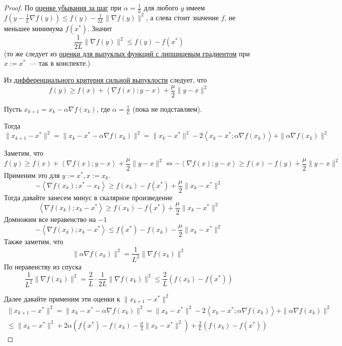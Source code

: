 \begin{proof}
  По \hyperref[note:FFEA1F1D-B70C-4B4A-9386-8344A2A3BBC4]{оценке убывания за шаг} при $\alpha = \frac{1}{L}$ для любого $y$ имеем $f\left(y - \frac{1}{L}\nabla f(y)\right) \le f(y) - \frac{1}{2L}\|\nabla f(y)\|^2$, а слева стоит значение $f$, не меньшее минимума $f(x^{*})$. Значит
  \[
  \frac{1}{2L}\| \nabla f(y)\|^2 \le f(y) - f(x^{*})
  \]
  (то же следует из \hyperref[note:655064DF-D686-4726-83DC-6F3D67CC5B9C]{оценки для выпуклых функций с липшицевым градиентом} при $x := x^{*}$~--- так в конспекте.)

  Из \hyperref[note:1B5A3E25-56E8-4D5E-9CF6-E2731DA77604]{дифференциального критерия сильной выпуклости} следует, что
  \[
  f(y) \ge f(x) + \left\langle \nabla f(x); y-x \right\rangle + \frac{\mu}{2} \|y-x\|^2
  \]

  Пусть $x_{k+1} = x_k -\alpha \nabla f(x_k)$, где $\alpha = \frac{1}{L}$ (пока не подставляем).

  Тогда
  \[
  \| x_{k+1} - x^{*}\|^2 = \|x_k - x^{*} - \alpha \nabla f(x_k)\|^2
  = \|x_k - x^{*}\|^2 - 2 \left\langle x_k - x^{*}; \alpha \nabla f(x_k) \right\rangle + \| \alpha \nabla f(x_k)\|^2
  \]

  Заметим, что
  \[
  f(y) \ge f(x) + \left\langle \nabla f(x); y-x \right\rangle + \frac{\mu}{2} \|y-x\|^2 \Leftrightarrow -
  \left\langle \nabla f(x); y-x \right\rangle \ge f(x) - f(y) + \frac{\mu}{2} \|y-x\|^2
  \]
  Применим это для $y:=x^{*}, x:=x_{k}$.
  \[
  -\left\langle \nabla f(x_k); x^{*}-x_k \right\rangle \ge f(x_k) - f(x^*) + \frac{\mu}{2} \|x_k-x^*\|^2
  \]
  Тогда давайте занесем минус в скалярное произведение
  \[
  \left\langle \nabla f(x_k); x_k - x^{*} \right\rangle \ge f(x_k) - f(x^*) + \frac{\mu}{2} \|x_k-x^*\|^2
  \]
  Домножим все неравенство на $-1$
  \[- \left\langle \nabla f(x_k); x_k - x^{*} \right\rangle \le  f(x^*) - f(x_k) - \frac{\mu}{2} \|x_k-x^*\|^2
  \]
  Также заметим, что
  \[
  \| \alpha \nabla f(x_k)\|^2 = \frac{1}{L^2} \| \nabla f(x_k)\|^2
  \]
  По неравенству из спуска
  \[
  \frac{1}{L^2} \| \nabla f(x_k)\|^2   = \frac{2}{L} \cdot \frac{1}{2L} \| \nabla f(x_k)\|^2
  \le \frac{2}{L} (f(x_k) - f(x^{*}))
  \]

  Далее давайте применим эти оценки к $\|x_{k+1} - x^{*}\|^2$
  \begin{multline*}
  \| x_{k+1} - x^{*}\|^2 = \|x_k - x^{*} - \alpha \nabla f(x_k)\|^2
  = \|x_k - x^{*}\|^2 - 2 \left\langle x_k - x^{*}; \alpha \nabla f(x_k) \right\rangle + \| \alpha \nabla f(x_k)\|^2 \\
  \le \|x_k - x^{*}\|^2 + 2\alpha \left( f(x^{*}) - f(x_k) - \frac{\mu}{2} \|x_k - x^{*}\|^2\right)
  + \frac{2}{L} (f(x_k) - f(x^{*}))
  \end{multline*}


\end{proof}
